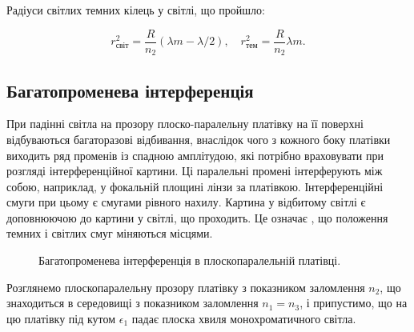 Радіуси світлих темних кілець у світлі, що пройшло:

\begin{equation}
	\label{rdark2}
	r_\text{світ}^2=\frac{R}{n_2}(\lambda m-\lambda/2), \quad r_\text{тем}^2=\frac{R}{n_2}\lambda m.
\end{equation}





\subsection*{Багатопроменева інтерференція}


При падінні світла на прозору плоско-паралельну платівку на її поверхні відбуваються багаторазові відбивання, внаслідок чого з кожного боку платівки виходить ряд променів із спадною амплітудою, які потрібно враховувати при розгляді інтерференційної картини. Ці паралельні промені інтерферують між собою, наприклад, у фокальній площині лінзи за платівкою. Інтерференційні смуги при цьому є смугами рівного нахилу. Картина у відбитому світлі є доповнюючою до картини у світлі, що проходить. Це означає , що положення темних і світлих смуг міняються місцями.


\begin{figure}[h!]\centering
	\def\N{5} %
    
	\caption{Багатопроменева інтерференція в плоскопаралельній платівці.}
	\label{pic:unterferece_in_film}
\end{figure}

Розглянемо плоскопаралельну прозору платівку з показником заломлення $n_2$, що знаходиться в середовищі з показником заломлення $n_1 = n_3$, і припустимо, що на цю платівку під кутом $\epsilon_1$ падає плоска хвиля монохроматичного світла.


